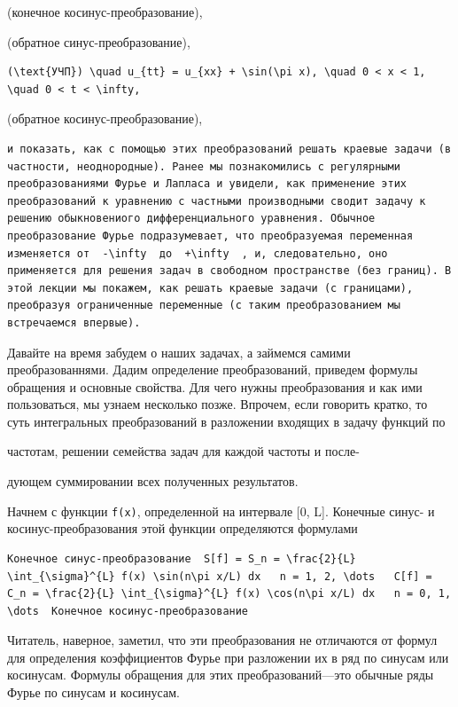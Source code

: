 \documentclass[
  ukrainian,
]{article}
\begin{document}
(конечное косинус-преобразование),

(обратное синус-преобразование),

\begin{verbatim}
(\text{УЧП}) \quad u_{tt} = u_{xx} + \sin(\pi x), \quad 0 < x < 1, \quad 0 < t < \infty,
\end{verbatim}

(обратное косинус-преобразование),

\begin{verbatim}
и показать, как с помощью этих преобразований решать краевые задачи (в частности, неоднородные). Ранее мы познакомились с регулярными преобразованиями Фурье и Лапласа и увидели, как применение этих преобразований к уравнению с частными производными сводит задачу к решению обыкновениого дифференциального уравнения. Обычное преобразование Фурье подразумевает, что преобразуемая переменная изменяется от  -\infty  до  +\infty  , и, следовательно, оно применяется для решения задач в свободном пространстве (без границ). В этой лекции мы покажем, как решать краевые задачи (с границами), преобразуя ограниченные переменные (с таким преобразованием мы встречаемся впервые).
\end{verbatim}

Давайте на время забудем о наших задачах, а займемся самими
преобразованнями. Дадим определение преобразований, приведем формулы
обращения и основные свойства. Для чего нужны преобразования и как ими
пользоваться, мы узнаем несколько позже. Впрочем, если говорить кратко,
то суть интегральных преобразований в разложении входящих в задачу
функций по

частотам, решении семейства задач для каждой частоты и после-

дующем суммировании всех полученных результатов.

Начнем с функции \texttt{f(x)}, определенной на интервале {[}0, L{]}.
Конечные синус- и косинус-преобразования этой функции определяются
формулами

\begin{verbatim}
Конечное синус-преобразование  S[f] = S_n = \frac{2}{L} \int_{\sigma}^{L} f(x) \sin(n\pi x/L) dx   n = 1, 2, \dots   C[f] = C_n = \frac{2}{L} \int_{\sigma}^{L} f(x) \cos(n\pi x/L) dx   n = 0, 1, \dots  Конечное косинус-преобразование
\end{verbatim}

Читатель, наверное, заметил, что эти преобразования не отличаются от
формул для определения коэффициентов Фурье при разложении их в ряд по
синусам или косинусам. Формулы обращения для этих преобразований---это
обычные ряды Фурье по синусам и косинусам.
\end{document}
